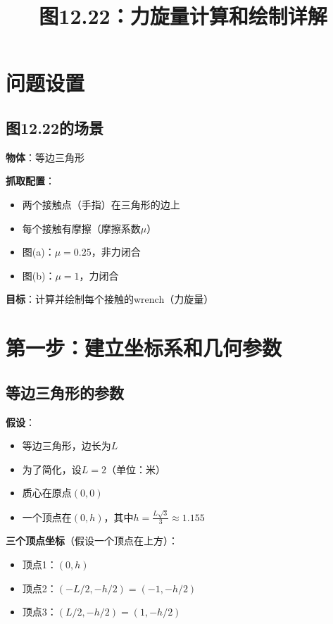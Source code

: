 \documentclass[12pt,a4paper]{article}
\title{图12.22：力旋量计算和绘制详解}
\author{}
\date{}
\begin{document}
\maketitle

\section{问题设置}

\subsection{图12.22的场景}

\textbf{物体}：等边三角形

\textbf{抓取配置}：
\begin{itemize}
\item 两个接触点（手指）在三角形的边上
\item 每个接触有摩擦（摩擦系数$\mu$）
\item 图(a)：$\mu = 0.25$，非力闭合
\item 图(b)：$\mu = 1$，力闭合
\end{itemize}

\textbf{目标}：计算并绘制每个接触的wrench（力旋量）

\section{第一步：建立坐标系和几何参数}

\subsection{等边三角形的参数}

\textbf{假设}：
\begin{itemize}
\item 等边三角形，边长为$L$
\item 为了简化，设$L = 2$（单位：米）
\item 质心在原点$(0, 0)$
\item 一个顶点在$(0, h)$，其中$h = \frac{L\sqrt{3}}{3} \approx 1.155$
\end{itemize}

\textbf{三个顶点坐标}（假设一个顶点在上方）：
\begin{itemize}
\item 顶点1：$(0, h)$
\item 顶点2：$(-L/2, -h/2) = (-1, -h/2)$
\item 顶点3：$(L/2, -h/2) = (1, -h/2)$
\end{itemize}
\end{document}
